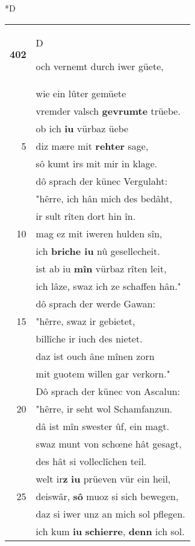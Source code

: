 \documentclass[8pt,a4paper,notitlepage]{article}
\begin{document}
\begin{table}[ht]
\begin{minipage}[t]{0.5\linewidth}
\small
\begin{center}*D
\end{center}
\begin{tabular}{rl}
\textbf{402} & \begin{large}D\end{large}och vernemt durch iwer güete,\\ 
 & wie ein lûter gemüete\\ 
 & vremder valsch \textbf{gevrumte} trüebe.\\ 
 & ob ich \textbf{iu} vürbaz üebe\\ 
5 & diz mære mit \textbf{rehter} sage,\\ 
 & sô kumt irs mit mir in klage.\\ 
 & dô sprach der künec Vergulaht:\\ 
 & "hêrre, ich hân mich des bedâht,\\ 
 & ir sult rîten dort hin în.\\ 
10 & mag ez mit iweren hulden sîn,\\ 
 & ich \textbf{briche iu} nû gesellecheit.\\ 
 & ist ab iu \textbf{mîn} vürbaz rîten leit,\\ 
 & ich lâze, swaz ich ze schaffen hân."\\ 
 & dô sprach der werde Gawan:\\ 
15 & "hêrre, swaz ir gebietet,\\ 
 & billîche ir iuch des nietet.\\ 
 & daz ist ouch âne mînen zorn\\ 
 & mit guotem willen gar verkorn."\\ 
 & Dô sprach der künec von Ascalun:\\ 
20 & "hêrre, ir seht wol Schamfanzun.\\ 
 & dâ ist mîn swester ûf, ein magt.\\ 
 & swaz munt von schœne hât gesagt,\\ 
 & des hât si volleclîchen teil.\\ 
 & welt ir\textbf{z} \textbf{iu} prüeven vür ein heil,\\ 
25 & deiswâr, \textbf{sô} muoz si sich bewegen,\\ 
 & daz si iwer unz an mich sol pflegen.\\ 
 & ich kum \textbf{iu} \textbf{schierre}, \textbf{denn} ich sol.\\ 

\end{tabular}
\end{minipage}
\end{table}
\end{document}
